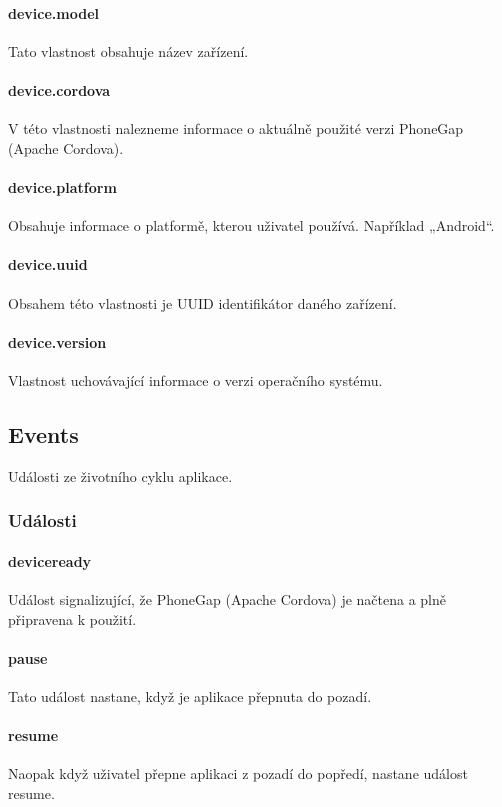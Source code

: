 \paragraph{device.model}
Tato vlastnost obsahuje název zařízení.

\paragraph{device.cordova}
V této vlastnosti nalezneme informace o aktuálně použité verzi PhoneGap (Apache Cordova).

\paragraph{device.platform}
Obsahuje informace o platformě, kterou uživatel používá. Například „Android“.

\paragraph{device.uuid}
Obsahem této vlastnosti je UUID identifikátor daného zařízení.

\paragraph{device.version}
Vlastnost uchovávající informace o verzi operačního systému.

\subsection{Events}
Události ze životního cyklu aplikace.

\subsubsection{Události}
\paragraph{deviceready}
Událost signalizující, že PhoneGap (Apache Cordova) je načtena a plně připravena k použití.

\paragraph{pause}
Tato událost nastane, když je aplikace přepnuta do pozadí.

\paragraph{resume}
Naopak když uživatel přepne aplikaci z pozadí do popředí, nastane událost resume.

